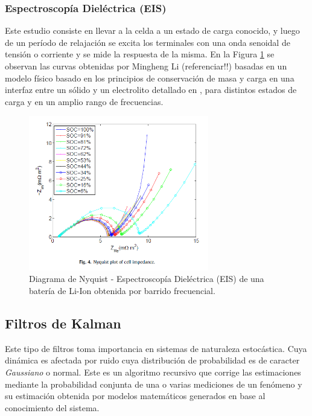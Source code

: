 \documentclass[10pt,a4paper]{article}
\begin{document}
	\clearpage

	\subsubsection{Espectroscopía Dieléctrica (EIS)}

	Este estudio consiste en llevar a la celda a un estado de carga conocido, 
    y luego de un período de relajación se excita los terminales con una onda 
    senoidal de tensión o corriente y se mide la respuesta de la misma. 
    En la Figura \ref{EIS_Nyquist} se observan las curvas obtenidas por 
    Mingheng Li (referenciar!!) basadas en un modelo físico basado en los 
    principios de conservación de masa y carga en una interfaz entre un sólido 
    y un electrolito detallado en \cite{Li2016}, para distintos estados de carga 
    y en un amplio rango de frecuencias. 
	
	\begin{figure}[h!]
		\begin{center}
			\includegraphics[width=0.7\textwidth]{EIS_Nyquist.png}
			\caption{Diagrama de Nyquist - Espectroscopía Dieléctrica (EIS) de 
                     una batería de Li-Ion obtenida por barrido frecuencial.}
			\label{EIS_Nyquist}
		\end{center}
	\end{figure}
	
	\clearpage
	
	\subsection{Filtros de Kalman}

	Este tipo de filtros toma importancia en sistemas de naturaleza estocástica. 
    Cuya dinámica es afectada por ruido cuya distribución de probabilidad es 
    de caracter \emph{Gaussiano} o normal. Este es un algoritmo recursivo que 
    corrige las estimaciones mediante la probabilidad conjunta de una o varias 
    mediciones de un fenómeno y su estimación obtenida por modelos matemáticos 
    generados en base al conocimiento del sistema.
	
\end{document}
